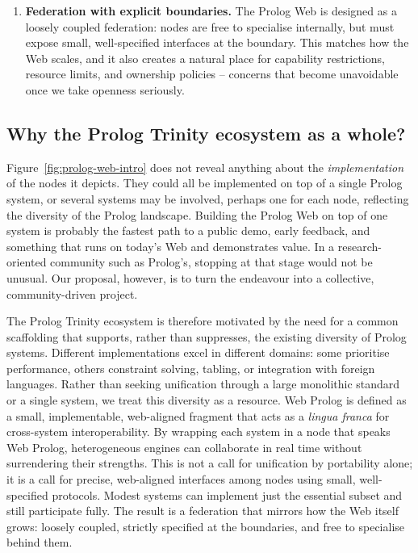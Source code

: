 \begin{enumerate}
\item \textbf{Federation with explicit boundaries.} 
The Prolog Web is designed as a loosely coupled federation: nodes are free to specialise internally, but must expose small, well-specified interfaces at the boundary. This matches how the Web scales, and it also creates a natural place for capability restrictions, resource limits, and ownership policies -- concerns that become unavoidable once we take openness seriously.

\end{enumerate}

\subsection{Why the Prolog Trinity ecosystem as a whole?}\label{sec:why-trinity-ecosystem}

Figure~\ref{fig:prolog-web-intro} does not reveal anything about the \textit{implementation} of the nodes it depicts. They could all be implemented on top of a single Prolog system, or several systems may be involved, perhaps one for each node, reflecting the diversity of the Prolog landscape. Building the Prolog Web on top of one system is probably the fastest path to a public demo, early feedback, and something that runs on today's Web and demonstrates value. In a research-oriented community such as Prolog's, stopping at that stage would not be unusual. Our proposal, however, is to turn the endeavour into a collective, community-driven project.

The Prolog Trinity ecosystem is therefore motivated by the need for a common scaffolding that supports, rather than suppresses, the existing diversity of Prolog systems. Different implementations excel in different domains: some prioritise performance, others constraint solving, tabling, or integration with foreign languages. Rather than seeking unification through a large monolithic standard or a single system, we treat this diversity as a resource. Web Prolog is defined as a small, implementable, web-aligned fragment that acts as a \emph{lingua franca} for cross-system interoperability. By wrapping each system in a node that speaks Web Prolog, heterogeneous engines can collaborate in real time without surrendering their strengths. This is not a call for unification by portability alone; it is a call for precise, web-aligned interfaces among nodes using small, well-specified protocols. Modest systems can implement just the essential subset and still participate fully. The result is a federation that mirrors how the Web itself grows: loosely coupled, strictly specified at the boundaries, and free to specialise behind them.

